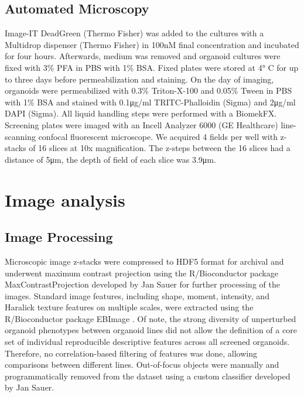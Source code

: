 \begin{flushleft}
\subsection{Automated Microscopy}
Image-IT DeadGreen (Thermo Fisher) was added to the cultures with a Multidrop dispenser (Thermo Fisher) in 100nM final concentration and incubated for four hours. Afterwards, medium was removed and organoid cultures were fixed with 3\% PFA in PBS with 1\% BSA. Fixed plates were stored at 4° C for up to three days before permeabilization and staining. On the day of imaging, organoids were permeabilized with 0.3\% Triton-X-100 and 0.05\% Tween in PBS with 1\% BSA and stained with 0.1μg/ml TRITC-Phalloidin (Sigma) and 2μg/ml DAPI (Sigma). All liquid handling steps were performed with a BiomekFX. Screening plates were imaged with an Incell Analyzer 6000 (GE Healthcare) line-scanning confocal fluorescent microscope. We acquired 4 fields per well with z-stacks of 16 slices at 10x magnification. The z-steps between the 16 slices had a distance of 5μm, the depth of field of each slice was 3.9μm.

\section{Image analysis}

\subsection{Image Processing}
Microscopic image z-stacks were compressed to HDF5 format for archival and underwent maximum contrast projection using the R/Bioconductor package MaxContrastProjection developed by Jan Sauer for further processing of the images. Standard image features, including shape, moment, intensity, and Haralick texture features on multiple scales, were extracted using the R/Bioconductor package EBImage \citep{pauEBImagePackageImage2010}. Of note, the strong diversity of unperturbed organoid phenotypes between organoid lines did not allow the definition of a core set of individual reproducible descriptive features across all screened organoids. Therefore, no correlation-based filtering of features was done, allowing comparisons between different lines. Out-of-focus objects were manually and programmatically removed from the dataset using a custom classifier developed by Jan Sauer.


\end{flushleft}
